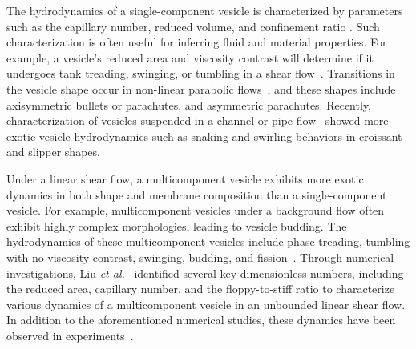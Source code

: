\documentclass[twoside,twocolumn,9pt]{article}
\begin{document}
The hydrodynamics of a single-component vesicle is characterized by parameters such as the capillary number, reduced volume, and confinement ratio  \cite{Abreu2014_ACI}. 
Such characterization is often useful for inferring fluid and material properties.
For example, a
vesicle's reduced area and viscosity contrast will determine if it
undergoes tank treading, swinging, or tumbling in a shear
flow~\cite{nog-gom2005}. Transitions in the vesicle shape occur in
non-linear parabolic flows~\cite{kao-bir-mis2009, dan-vla-mis2009}, and
these shapes include axisymmetric bullets or parachutes, and asymmetric
parachutes. Recently, characterization of 
vesicles suspended in a channel or pipe
flow~\cite{lyu-che-far-jae-mis-leo2023, aga-bir2020, qua-gan-you2021,
abb-far-nai-ezz-ben-mis2022} showed more exotic vesicle hydrodynamics such as snaking and
swirling behaviors in croissant and slipper shapes.

Under a linear shear flow, a multicomponent vesicle exhibits more exotic dynamics in both shape and membrane composition \cite{soh-tse-li-voi-low2010, Smith2007_JChemPhys,Cox2015_Nonlinearity,liu-mar-li-vee-low2017,Tusch2018_PRF,Gera2018_SoftMatter,ger-sal-spa2022} than a single-component vesicle.
For example, multicomponent vesicles under a background flow often exhibit highly complex morphologies, leading to vesicle budding. 
The hydrodynamics of these
multicomponent vesicles include phase treading, tumbling with no
viscosity contrast, swinging, budding, and
fission~\cite{soh-tse-li-voi-low2010, wan-du2008, all-ama2006,
ger-sal-spa2022, lip1992, urs-klu-phi2009}. 
Through numerical investigations, 
Liu {\it et al.}~\cite{liu-mar-li-vee-low2017} identified several key dimensionless numbers, including the reduced area, capillary
number, and the floppy-to-stiff ratio to characterize various dynamics of a
multicomponent vesicle in an unbounded linear shear flow. In addition to the
aforementioned numerical studies, these dynamics have been observed in
experiments~\cite{bag-sun2009, yan-ima-tan2010, yan-ima-tan2008,
dre-jah-bob-spa-gop2021}.
\end{document}
